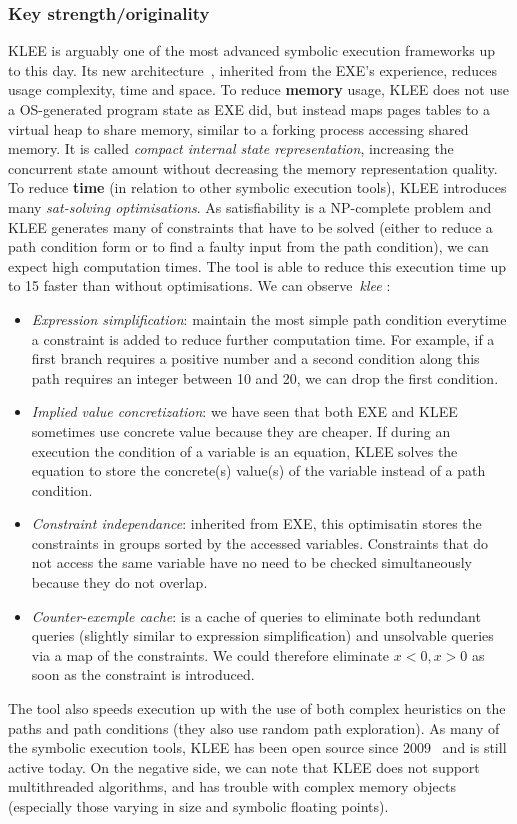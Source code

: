\documentclass[11pt, conference]{IEEEtran}
\begin{document}
    \subsubsection*{Key strength/originality}
    KLEE is arguably one of the most advanced symbolic execution frameworks up to this day. Its new architecture~\cite{klee}, inherited from the EXE's experience, reduces usage complexity, time and space. To reduce \textbf{memory} usage, KLEE does not use a OS-generated program state as EXE did, but instead maps pages tables to a virtual heap to share memory, similar to a forking process accessing shared memory. It is called \emph{compact internal state representation}, increasing the concurrent state amount without decreasing the memory representation quality. To reduce \textbf{time} (in relation to other symbolic execution tools), KLEE introduces many \emph{sat-solving optimisations}. As satisfiability is a NP-complete problem and KLEE generates many of constraints that have to be solved (either to reduce a path condition form or to find a faulty input from the path condition), we can expect high computation times. The tool is able to reduce this execution time up to 15 faster than without optimisations. We can observe~\emph{klee} :
    \begin{itemize}
      \item \emph{Expression simplification}: maintain the most simple path condition everytime a constraint is added to reduce further computation time. For example, if a first branch requires a positive number and a second condition along this path requires an integer between 10 and 20, we can drop the first condition.
      \item \emph{Implied value concretization}: we have seen that both EXE and KLEE sometimes use concrete value because they are cheaper. If during an execution the condition of a variable is an equation, KLEE solves the equation to store the concrete(s) value(s) of the variable instead of a path condition.
      \item \emph{Constraint independance}: inherited from EXE, this optimisatin stores the constraints in groups sorted by the accessed variables. Constraints that do not access the same variable have no need to be checked simultaneously because they do not overlap.
      \item \emph{Counter-exemple cache}: is a cache of queries to eliminate both redundant queries (slightly similar to expression simplification) and unsolvable queries via a map of the constraints. We could therefore eliminate ${x < 0, x > 0}$ as soon as the constraint is introduced.
    \end{itemize}
    The tool also speeds execution up with the use of both complex heuristics on the paths and path conditions (they also use random path exploration). As many of the symbolic execution tools, KLEE has been open source since 2009~\cite{KleeGitRepo} and is still active today. On the negative side, we can note that KLEE does not support multithreaded algorithms, and has trouble with complex memory objects (especially those varying in size and symbolic floating points).
\end{document}

